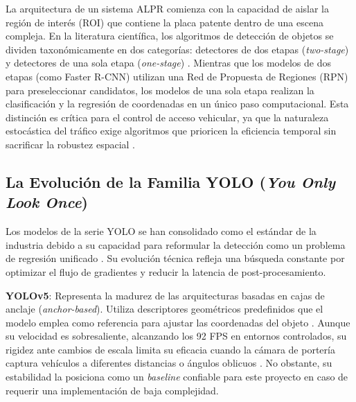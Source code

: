 La arquitectura de un sistema ALPR comienza con la capacidad de aislar la región de 
interés (ROI) que contiene la placa patente dentro de una escena compleja. En la 
literatura científica, los algoritmos de detección de objetos se dividen 
taxonómicamente en dos categorías: detectores de dos etapas (\textit{two-stage}) y 
detectores de una sola etapa (\textit{one-stage}) 
\parencite{PDFRealTimeLicense2026, xuDeepLearningAlgorithms2026c}. 
Mientras que los modelos de dos etapas (como Faster R-CNN) utilizan una Red de 
Propuesta de Regiones (RPN) para preseleccionar candidatos, los modelos de una sola 
etapa realizan la clasificación y la regresión de coordenadas en un único paso 
computacional. Esta distinción es crítica para el control de acceso vehicular, ya que 
la naturaleza estocástica del tráfico exige algoritmos que prioricen la eficiencia 
temporal sin sacrificar la robustez espacial 
\parencite{oluwaseyiComparativeAnalysisYOLOv52025, swatiEfficientDeepLearning2024, 
xuDeepLearningAlgorithms2026c}.

\subsection{La Evolución de la Familia YOLO (\textit{You Only Look Once})}

Los modelos de la serie YOLO se han consolidado como el estándar de la industria 
debido a su capacidad para reformular la detección como un problema de regresión 
unificado \parencite{athilakshmiAutomaticNumberPlate2023, mobeenRealTimeAutomaticLicense2026}. 
Su evolución técnica refleja una búsqueda constante por optimizar el flujo de gradientes 
y reducir la latencia de post-procesamiento.

\textbf{YOLOv5}: Representa la madurez de las arquitecturas basadas en cajas de anclaje 
(\textit{anchor-based}). Utiliza descriptores geométricos predefinidos que el modelo emplea 
como referencia para ajustar las coordenadas del objeto 
\parencite{athilakshmiAutomaticNumberPlate2023, oluwaseyiComparativeAnalysisYOLOv52025}. 
Aunque su velocidad es sobresaliente, alcanzando los 92 FPS en entornos controlados, su 
rigidez ante cambios de escala limita su eficacia cuando la cámara de portería captura 
vehículos a diferentes distancias o ángulos oblicuos 
\parencite{oluwaseyiComparativeAnalysisYOLOv52025, swatiEfficientDeepLearning2024}. 
No obstante, su estabilidad la posiciona como un \textit{baseline} confiable para este 
proyecto en caso de requerir una implementación de baja complejidad.

